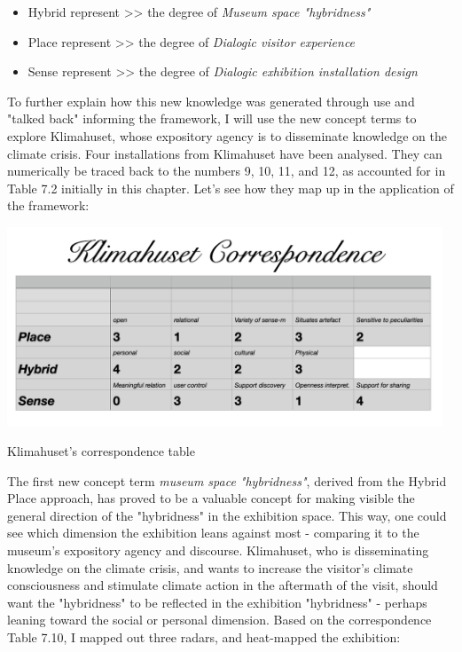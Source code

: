 \begin{itemize}
    \item Hybrid represent >> the degree of \textit{Museum space "hybridness"}
    \item Place represent >> the degree of \textit{Dialogic visitor experience}
    \item Sense represent >> the degree of \textit{Dialogic exhibition installation design}
\end{itemize}

To further explain how this new knowledge was generated through use and "talked back" informing the framework, I will use the new concept terms to explore Klimahuset, whose expository agency is to disseminate knowledge on the climate crisis. Four installations from Klimahuset have been analysed. They can numerically be traced back to the numbers 9, 10, 11, and 12, as accounted for in Table 7.2 initially in this chapter. Let's see how they map up in the application of the framework:

\begin{table}[H]
\centering 
\includegraphics[width=13cm]{pictures/analysis/klimahuset_corr.png}
\caption{Klimahuset's correspondence table}
\end{table}

The first new concept term \textit{museum space "hybridness"}, derived from the Hybrid Place approach, has proved to be a valuable concept for making visible the general direction of the "hybridness" in the exhibition space. This way, one could see which dimension the exhibition leans against most - comparing it to the museum's expository agency and discourse. Klimahuset, who is disseminating knowledge on the climate crisis, and wants to increase the visitor's climate consciousness and stimulate climate action in the aftermath of the visit, should want the "hybridness" to be reflected in the exhibition "hybridness" - perhaps leaning toward the social or personal dimension. Based on the correspondence Table 7.10, I mapped out three radars, and heat-mapped the exhibition:

